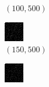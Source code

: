 \documentclass[a4paper, landscape]{article}
\begin{document}
\begin{figure}[H]
\begin{subfigure}{0.12\linewidth}
        \caption{$(100, 500)$}
    \end{subfigure}
    \begin{subfigure}{0.12\linewidth}
        \centering
        \includegraphics[width=\linewidth]{iht/k = 150, m = 500.png}
        \caption{$(150, 500)$}
    \end{subfigure}
    \begin{subfigure}{0.12\linewidth}
        \centering
        \includegraphics[width=\linewidth]{iht/k = 200, m = 500.png}

\end{subfigure}
\end{figure}
\end{document}
